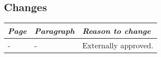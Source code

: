 \subsection*{Changes}
\begin{tabular}{llp{10cm}}
    \toprule
    \emph{Page} & \emph{Paragraph} & \emph{Reason to change} \\
    \midrule
    - & - & Externally approved. \\
    \bottomrule
\end{tabular}